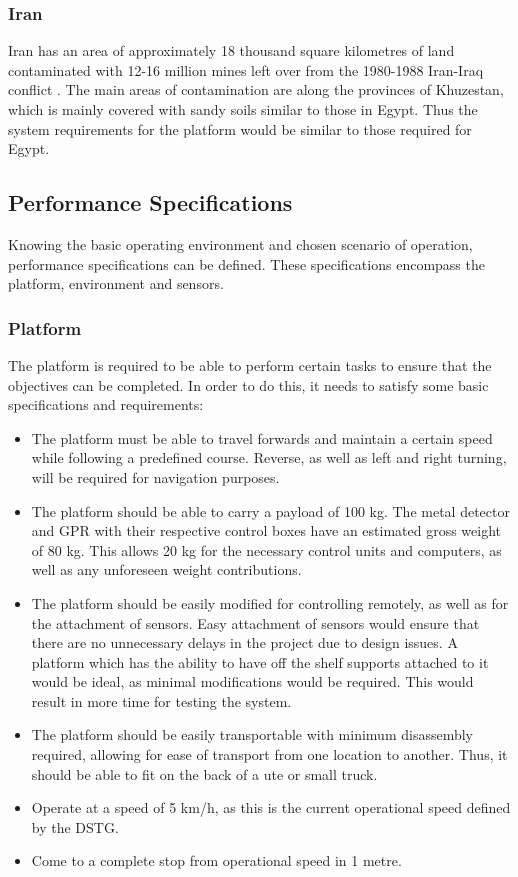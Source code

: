 \documentclass[main.tex]{subfiles}
\begin{document}
 \subsubsection{Iran}
Iran has an area of approximately 18 thousand square kilometres of land contaminated with 12-16 million mines left over from the 1980-1988 Iran-Iraq conflict \parencite{landmineMonitor2015}. The main areas of contamination are along the provinces of Khuzestan, which is mainly covered with sandy soils similar to those in Egypt. Thus the system requirements for the platform would be similar to those required for Egypt.

\subsection{Performance Specifications}
Knowing the basic operating environment and chosen scenario of operation, performance specifications can be defined. These specifications encompass the platform, environment and sensors.
\subsubsection{Platform}
The platform is required to be able to perform certain tasks to ensure that the objectives can be completed. In order to do this, it needs to satisfy some basic specifications and requirements: 
\begin{itemize}
\item The platform must be able to travel forwards and maintain a certain speed while following a predefined course. Reverse, as well as left and right turning, will be required for navigation purposes.
 \item The platform should be able to carry a payload of 100 kg. The metal detector and GPR with their respective control boxes have an estimated gross weight of 80 kg. This allows 20 kg for the necessary control units and computers, as well as any unforeseen weight contributions. 
\item The platform should be easily modified for controlling remotely, as well as for the attachment of sensors. Easy attachment of sensors would ensure that there are no unnecessary delays in the project due to design issues. A platform which has the ability to have off the shelf supports attached to it would be ideal, as minimal modifications would be required. This would result in more time for testing the system. 
\item The platform should be easily transportable with minimum disassembly required, allowing for ease of transport from one location to another. Thus, it should be able to fit on the back of a ute or small truck.
\item Operate at a speed of 5 km/h, as this is the current operational speed defined by the DSTG.
\item Come to a complete stop from operational speed in 1 metre.
\end{itemize}
\end{document}
